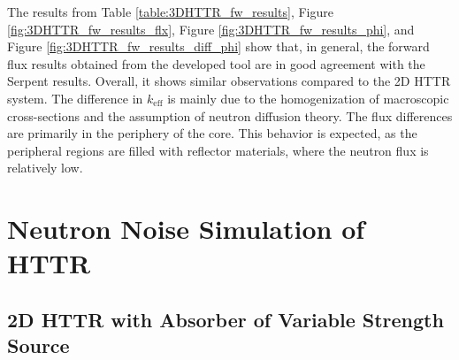 The results from Table \ref{table:3DHTTR_fw_results}, Figure \ref{fig:3DHTTR_fw_results_flx}, Figure \ref{fig:3DHTTR_fw_results_phi}, and Figure \ref{fig:3DHTTR_fw_results_diff_phi} show that, in general, the forward flux results obtained from the developed tool are in good agreement with the Serpent results. Overall, it shows similar observations compared to the 2D HTTR system. The difference in $k_{\text{eff}}$ is mainly due to the homogenization of macroscopic cross-sections and the assumption of neutron diffusion theory. The flux differences are primarily in the periphery of the core. This behavior is expected, as the peripheral regions are filled with reflector materials, where the neutron flux is relatively low. 

\section{Neutron Noise Simulation of HTTR}

\subsection{2D HTTR with Absorber of Variable Strength Source}

